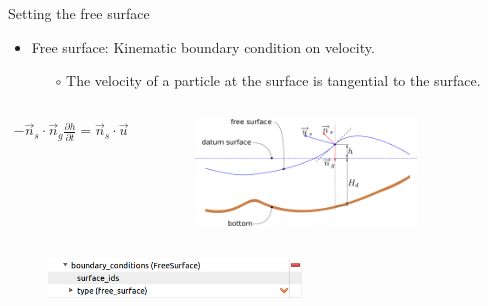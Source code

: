 \documentclass[t]{beamer}
\begin{document}
\begin{frame}{Setting the free surface}
\begin{itemize}
  \item Free surface: Kinematic boundary condition on velocity.
  \begin{itemize}
    \item[$\circ$] The velocity of a particle at the surface is tangential to the surface.
  \end{itemize}
\end{itemize}

\begin{columns}[l]
\column{2.5in}
  \begin{align*}
    -\overrightarrow{n}_s \cdot \overrightarrow{n}_g\frac{\partial h}{\partial t} = \overrightarrow{n}_s \cdot \overrightarrow{u}
  \end{align*}

\column{2.5in}
  \begin{figure}[htbp!]
   \centering
    \includegraphics[width=0.8\textwidth]{figures/free_surface}
  \end{figure}
\end{columns}

\begin{figure}[htbp!]
 \centering
  \includegraphics[width=0.6\textwidth]{figures/freesurface}
\end{figure}

\end{frame}
\end{document}
